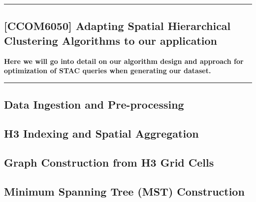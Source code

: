 {\color{gray}\hrule}
\begin{center}
\section{[CCOM6050] Adapting Spatial Hierarchical Clustering Algorithms to our application}
\textbf{Here we will go into detail on our algorithm design and approach for optimization of STAC queries when generating our dataset.}
\bigskip
\end{center}
{\color{gray}\hrule}

\begin{multicols}{2}

\subsection{Data Ingestion and Pre-processing}


\subsection{H3 Indexing and Spatial Aggregation}

\subsection{Graph Construction from H3 Grid Cells}

\subsection{Minimum Spanning Tree (MST) Construction}


\end{multicols}
